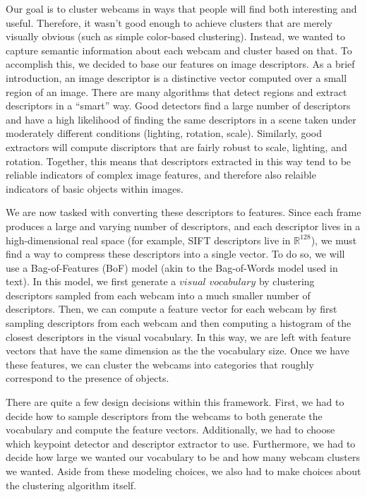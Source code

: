 \documentclass{article}
\begin{document}
Our goal is to cluster webcams in ways that people will find both interesting
and useful. Therefore, it wasn't good enough to achieve clusters that are
merely visually obvious (such as simple color-based clustering). Instead, we
wanted to capture semantic information about each webcam and cluster based on
that. To accomplish this, we decided to base our features on image descriptors.
As a brief introduction, an image descriptor is a distinctive vector computed
over a small region of an image. There are many algorithms that detect regions
and extract descriptors in a ``smart'' way. Good detectors find a large number
of descriptors and have a high likelihood of finding the same descriptors in a
scene taken under moderately different conditions (lighting, rotation, scale).
Similarly, good extractors will compute discriptors that are fairly robust to
scale, lighting, and rotation. Together, this means that descriptors extracted
in this way tend to be reliable indicators of complex image features, and
therefore also relaible indicators of basic objects within images.

We are now tasked with converting these descriptors to features. Since each
frame produces a large and varying number of descriptors, and each descriptor
lives in a high-dimensional real space (for example, SIFT descriptors live in
$\mathbb{R}^{128}$), we must find a way to compress these descriptors into a
single vector. To do so, we will use a Bag-of-Features (BoF) model (akin to the
Bag-of-Words model used in text). In this model, we first generate a
$\textit{visual vocabulary}$ by clustering descriptors sampled from each webcam
into a much smaller number of descriptors. Then, we can compute a feature
vector for each webcam by first sampling descriptors from each webcam and then
computing a histogram of the closest descriptors in the visual vocabulary. In
this way, we are left with feature vectors that have the same dimension as the
the vocabulary size. Once we have these features, we can cluster the webcams
into categories that roughly correspond to the presence of objects.

There are quite a few design decisions within this framework. First, we had to
decide how to sample descriptors from the webcams to both generate the
vocabulary and compute the feature vectors. Additionally, we had to choose
which keypoint detector and descriptor extractor to use. Furthermore, we had to
decide how large we wanted our vocabulary to be and how many webcam clusters we
wanted.  Aside from these modeling choices, we also had to make choices about
the clustering algorithm itself.
\end{document}
